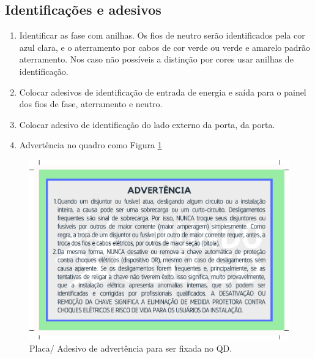 \subsection{Identificações e adesivos}
\begin{enumerate}
\item Identificar as fase com anilhas. Os fios de neutro serão identificados pela cor azul clara, e o aterramento por cabos de cor verde ou verde e amarelo padrão aterramento. Nos caso não possíveis a distinção por cores usar anilhas de identificação.
\item Colocar adesivos de identificação de entrada de energia e saída para o painel dos fios de fase, aterramento e neutro.
\item  Colocar adesivo de identificação do lado externo da porta, da porta.
\item Advertência no quadro como Figura \ref{fig:advQD}
\end{enumerate}


\begin{figure}[htbp]
    \centering
    \includegraphics[scale=0.5]{image/EtiqAdvQD.pdf}
    \caption{Placa/ Adesivo de advertência para ser fixada no QD.}
    \label{fig:advQD}
\end{figure}